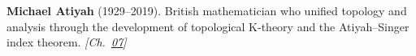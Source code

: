 \textbf{Michael Atiyah} (1929–2019). British mathematician who unified topology and analysis through the development of topological K-theory and the Atiyah–Singer index theorem. \emph{[Ch.~\hyperref[ch:billiardsconicsporism]{07}]}

